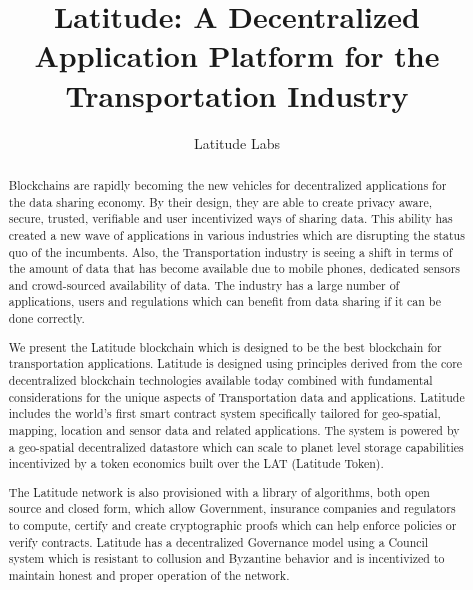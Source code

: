 \documentclass[preprint,11pt]{elsarticle}
\theoremstyle{definition}
\begin{document}
\begin{frontmatter}


\title{\textsf{Latitude: A Decentralized Application Platform for the Transportation Industry}}

\author{Latitude Labs}
\address{Silicon Valley, California}

\begin{abstract}
\fontsize{10pt}{12pt}\selectfont
Blockchains are rapidly becoming the new vehicles for decentralized applications for the data sharing economy. By their
    design, they are able to create privacy aware, secure, trusted, verifiable and user incentivized ways of sharing
    data. This ability has created a new wave of applications in various industries which are disrupting the status quo
    of the incumbents. Also, the Transportation industry is seeing a shift in terms of the amount of data that has
    become available due to mobile phones, dedicated sensors and crowd-sourced availability of data. The industry has a
    large number of applications, users and regulations which can benefit from data sharing if it can be done correctly.

 We present the Latitude blockchain which is designed to be the best blockchain for transportation applications.
    Latitude is designed using principles derived from the core decentralized blockchain technologies available today
    combined with fundamental considerations for the unique aspects of Transportation data and applications. Latitude
    includes the world's first smart contract system specifically tailored for geo-spatial, mapping, location and sensor
    data and related applications. The system is powered by a geo-spatial decentralized datastore which can scale to
    planet level storage capabilities incentivized by a token economics built over the LAT (Latitude Token).

    The Latitude network is also provisioned with a library of algorithms, both open source and closed form, which allow
    Government, insurance companies and regulators to compute, certify and create cryptographic proofs which can help enforce policies
    or verify contracts.  Latitude has a decentralized Governance model using a Council system which is resistant to
    collusion and Byzantine behavior and is incentivized to maintain honest and proper operation of the network.


\end{abstract}
\end{frontmatter}
\end{document}
